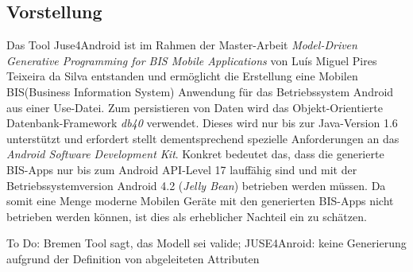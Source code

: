 \documentclass[a4paper,twoside]{article}
\begin{document}


\subsection{Vorstellung}
Das Tool Juse4Android ist im Rahmen der Master-Arbeit \textit{Model-Driven Generative Programming for BIS Mobile Applications} von Luís Miguel Pires Teixeira da Silva entstanden und ermöglicht die Erstellung eine Mobilen BIS(Business Information System) Anwendung für das Betriebssystem Android aus einer Use-Datei. Zum persistieren von Daten wird das Objekt-Orientierte Datenbank-Framework \textit{db40} verwendet. Dieses wird nur bis zur Java-Version 1.6 unterstützt und erfordert stellt dementsprechend spezielle Anforderungen an das \textit{Android Software Development Kit}. Konkret bedeutet das, dass die generierte BIS-Apps nur bis zum Android API-Level 17 lauffähig sind und mit der Betriebssystemversion Android 4.2 (\textit{Jelly Bean}) betrieben werden müssen. Da somit eine Menge moderne Mobilen Geräte mit den generierten BIS-Apps nicht betrieben werden können, ist dies als erheblicher Nachteil ein zu schätzen.

To Do: Bremen Tool sagt, das Modell sei valide; JUSE4Anroid: keine Generierung aufgrund der Definition von abgeleiteten Attributen
\end{document}
